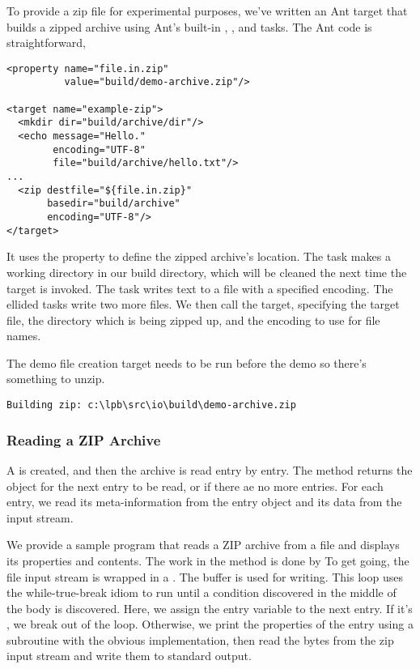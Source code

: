 To provide a zip file for experimental purposes, we've written
an Ant target  that builds a zipped archive
using Ant's built-in , , and 
tasks.  The Ant code is straightforward,
%
\begin{verbatim}
<property name="file.in.zip" 
          value="build/demo-archive.zip"/>

<target name="example-zip">
  <mkdir dir="build/archive/dir"/>    
  <echo message="Hello."  
        encoding="UTF-8" 
        file="build/archive/hello.txt"/>
...
  <zip destfile="${file.in.zip}"
       basedir="build/archive" 
       encoding="UTF-8"/>
</target>
\end{verbatim}
%
It uses the property  to define the zipped archive's
location.  The  task makes a working directory in our
build directory, which will be cleaned the next time the 
target is invoked.  The  task writes text to a file with a
specified encoding.  The ellided tasks write two more files.  We then
call the  target, specifying the target file, the directory
which is being zipped up, and the encoding to use for file names.

The demo file creation target needs to be run before the demo so
there's something to unzip.
%
\begin{verbatim}
Building zip: c:\lpb\src\io\build\demo-archive.zip
\end{verbatim}
%

\subsubsection{Reading a ZIP Archive}

A  is created, and then the archive is read entry
by entry.  The method  returns the
 object for the next entry to be read, or 
if there ae no more entries.  For each entry, we read its
meta-information from the entry object and its data from the
input stream.

We provide a sample program  that reads a ZIP
archive from a file and displays its properties and contents.  The
work in the  method is done by
%
%
To get going, the file input stream is wrapped in a
.  The buffer  is used for
writing.  This loop uses the while-true-break idiom to
run until a condition discovered in the middle of the body
is discovered.  Here, we assign the entry variable to
the next entry.  If it's , we break out of the
loop.  Otherwise, we print the properties of the entry
using a subroutine with the obvious implementation, then
read the bytes from the zip input stream and write
them to standard output.
  
